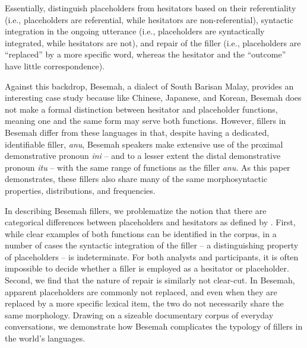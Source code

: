 \documentclass[output=paper,
\ChapterDOI{10.5281/zenodo.15697583}
colorlinks,
citecolor=brown]{langscibook}
\begin{document}
Essentially, \citet{hayashi2006crosslinguistic} distinguish placeholders from hesitators based on their referentiality (i.e., placeholders are referential, while hesitators are non-referential), syntactic integration in the ongoing utterance (i.e., placeholders are syntactically integrated, while hesitators are not), and repair of the filler (i.e., placeholders are ``replaced'' by a more specific word, whereas the hesitator and the ``outcome'' have little correspondence).  

Against this backdrop, Besemah, a dialect of South Barisan Malay, provides an interesting case study because like Chinese, Japanese, and Korean, Besemah does not make a formal distinction between hesitator and placeholder functions, meaning one and the same form may serve both functions. However, fillers in Besemah differ from these languages in that, despite having a dedicated, identifiable filler, \textit{anu}, Besemah speakers make extensive use of the proximal demonstrative pronoun \textit{ini} -- and to a lesser extent the distal demonstrative pronoun \textit{itu} -- with the same range of functions as the filler \textit{anu}. As this paper demonstrates, these fillers also share many of the same morphosyntactic properties, distributions, and frequencies.

In describing Besemah fillers, we problematize the notion that there are categorical differences between placeholders and hesitators as defined by \citet{hayashi2006crosslinguistic}. First, while clear examples of both functions can be identified in the corpus, in a number of cases the syntactic integration of the filler -- a distinguishing property of placeholders -- is indeterminate. For both analysts and participants, it is often impossible to decide whether a filler is employed as a hesitator or placeholder. Second, we find that the nature of repair is similarly not clear-cut. In Besemah, apparent placeholders are commonly not replaced, and even when they are replaced by a more specific lexical item, the two do not necessarily share the same morphology. Drawing on a sizeable documentary corpus of everyday conversations, we demonstrate how Besemah complicates the typology of fillers in the world's languages.
\end{document}
